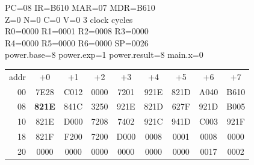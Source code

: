 \begin{tcolorbox}[stepbox, title={Step 23 \hfill PC 07 \quad BLE power.endwhile1}]
PC=08 IR=B610 MAR=07 MDR=B610\\
Z=0 N=0 C=0 V=0 \hfill \textcolor{dim}{3 clock cycles}\\
R0=0000 R1=0001 R2=0008 R3=0000\\
R4=0000 R5=0000 R6=0000 SP=0026\\
\textcolor{dim}{power.base=8  power.exp=1  power.result=8  main.x=0}\\[1pt]
{\setlength{\tabcolsep}{1.6pt}\begin{tabular}{@{}r*{8}{c}@{}}
\textcolor{dim}{addr} & \textcolor{dim}{+0} & \textcolor{dim}{+1} & \textcolor{dim}{+2} & \textcolor{dim}{+3} & \textcolor{dim}{+4} & \textcolor{dim}{+5} & \textcolor{dim}{+6} & \textcolor{dim}{+7}\\
\textcolor{dim}{00} & 7E28 & C012 & 0000 & 7201 & 921E & 821D & A040 & B610\\
\textcolor{dim}{08} & \cellcolor{pcc}\textbf{821E} & 841C & 3250 & 921E & 821D & 627F & 921D & B005\\
\textcolor{dim}{10} & 821E & D000 & 7208 & 7402 & 921C & 941D & C003 & 921F\\
\textcolor{dim}{18} & 821F & F200 & 7200 & D000 & \cellcolor{datac}0008 & \cellcolor{datac}0001 & \cellcolor{datac}0008 & \cellcolor{datac}0000\\
\textcolor{dim}{20} & \cellcolor{stackc}0000 & \cellcolor{stackc}0000 & \cellcolor{stackc}0000 & \cellcolor{stackc}0000 & \cellcolor{stackc}0000 & \cellcolor{stackc}0000 & \cellcolor{stackc}0017 & \cellcolor{stackc}0002\\
\end{tabular}}
\end{tcolorbox}\par\vspace{3pt}
